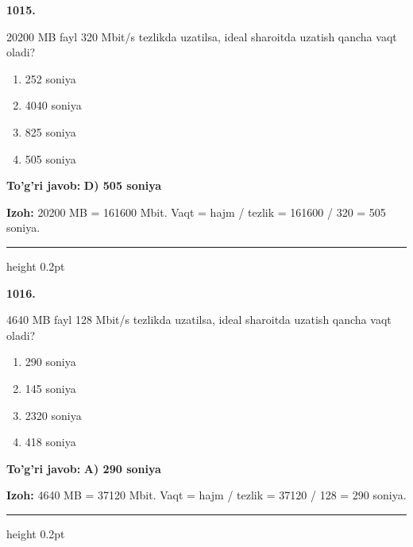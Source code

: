 \documentclass[10pt,a4paper,oneside]{article}
\begin{document}
\noindent\textbf{\color{ink}1015.}
\par
20200 MB fayl 320 Mbit/s tezlikda uzatilsa, ideal sharoitda uzatish qancha vaqt oladi?
\begin{enumerate}[label=\Alph*),leftmargin=9mm]
\item 252 soniya
\item 4040 soniya
\item 825 soniya
\item 505 soniya
\end{enumerate}
\begin{tcolorbox}[enhanced,breakable,colback=teal!4,colframe=teal!50!black,boxrule=0.5pt,arc=1.1mm,left=3mm,right=3mm,top=1.7mm,bottom=1.7mm,before skip=2mm,after skip=2mm]
\textbf{\color{teal}To'g'ri javob:} \textbf{D) 505 soniya}
\par\smallskip
\textbf{Izoh:} 20200 MB = 161600 Mbit. Vaqt = hajm / tezlik = 161600 / 320 = 505 soniya.
\end{tcolorbox}
\vspace{2mm}\hrule height 0.2pt \vspace{3mm}

\noindent\textbf{\color{ink}1016.}
\par
4640 MB fayl 128 Mbit/s tezlikda uzatilsa, ideal sharoitda uzatish qancha vaqt oladi?
\begin{enumerate}[label=\Alph*),leftmargin=9mm]
\item 290 soniya
\item 145 soniya
\item 2320 soniya
\item 418 soniya
\end{enumerate}
\begin{tcolorbox}[enhanced,breakable,colback=teal!4,colframe=teal!50!black,boxrule=0.5pt,arc=1.1mm,left=3mm,right=3mm,top=1.7mm,bottom=1.7mm,before skip=2mm,after skip=2mm]
\textbf{\color{teal}To'g'ri javob:} \textbf{A) 290 soniya}
\par\smallskip
\textbf{Izoh:} 4640 MB = 37120 Mbit. Vaqt = hajm / tezlik = 37120 / 128 = 290 soniya.
\end{tcolorbox}
\vspace{2mm}\hrule height 0.2pt \vspace{3mm}
\end{document}
